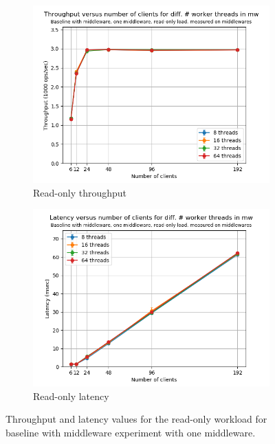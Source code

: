 \documentclass[11pt,a4paper]{article}
\begin{document}
\begin{figure}[h]
\centering
\begin{subfigure}{.5\textwidth}
  \centering
  \includegraphics[width=1.0\linewidth,trim={0px 0px 0px 0px},clip]{img/plot/mwb1-ro-tp_mw.png}
  \caption{Read-only throughput}
  \label{fig:mwb1-ro-tp_mw}
\end{subfigure}%
\begin{subfigure}{.5\textwidth}
  \centering
  \includegraphics[width=1.0\linewidth,trim={0px 0px 0px 0px},clip]{img/plot/mwb1-ro-lat_mw.png}
  \caption{Read-only latency}
  \label{fig:mwb1-ro-lat_mw}
\end{subfigure}
\caption{Throughput and latency values for the read-only workload for baseline with middleware experiment with one middleware.}
\label{fig:mwb1-ro_mw}
\end{figure}
\end{document}
